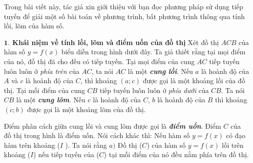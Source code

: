 Trong bài viết này, tác giả xin giới thiệu với bạn đọc phương pháp sử dụng tiếp tuyến để giải một số bài toán về phương trình, bất phương trình thông qua tính lồi, lõm của hàm số.

\begin{multicols}{2}
	\textbf{\color{diendantoanhoc}$\pmb{1.}$ Khái niệm về tính lồi, lõm và điểm uốn của đồ thị}
	\vskip 0.1cm
	Xét đồ thị $ACB$ của hàm số $y = f(x)$ biểu diễn trong hình dưới đây. Ta giả thiết rằng tại mọi điểm của nó, đồ thị đã cho đều có tiếp tuyến. Tại mọi điểm của cung $AC$ tiếp tuyến luôn luôn ở \emph{phía trên} của $AC$, ta nói $AC$ là một \textbf{\color{diendantoanhoc}\itshape cung lồi}. Nếu $a$ là hoành độ của $A$ và $c$ là hoành độ của $C$, thì khoảng $(a; c)$ được gọi là một khoảng lồi của đồ thị. Tại mỗi điểm của cung $CB$ tiếp tuyến luôn luôn ở \emph{\itshape phía dưới} của $CB$. Ta nói $CB$ là một \textbf{\color{diendantoanhoc}\itshape cung lõm}. Nếu $c$ là hoành độ của $C$, $b$ là hoành độ của $B$ thì khoảng $(c; b)$ được gọi là một khoảng lõm của đồ thị.
	\begin{center}
	\end{center}
	Điểm phân cách giữa cung lồi và cung lõm được gọi là \textbf{\color{diendantoanhoc}\itshape điểm uốn}. Điểm $C$ của đồ thị trong hình là điểm uốn.
	\vskip 0.1cm
	Nói cách khác thì: 
	Nếu hàm số $y=f(x)$ có đạo hàm trên khoảng ($I$ ). Ta nói rằng
	\vskip 0.1cm
	$a)$ Đồ thị ($C$) của hàm số $y = f(x)$ lồi trên khoảng ($I$) nếu tiếp tuyến của ($C$) tại mỗi điểm của nó đều nằm phía trên đồ thị.

\end{multicols}
